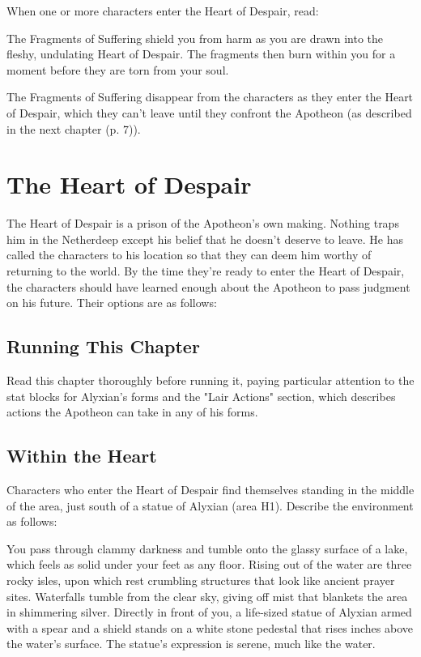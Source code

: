 \documentclass[letterpaper, 11pt, bg=full, twocolumn]{dndbook}
\begin{document}
When one or more characters enter the Heart of Despair, read:

\begin{DndReadAloud}
The Fragments of Suffering shield you from harm as you are drawn into the fleshy, undulating Heart of Despair. The fragments then burn within you for a moment before they are torn from your soul.
\end{DndReadAloud}

The Fragments of Suffering disappear from the characters as they enter the Heart of Despair, which they can't leave until they confront the Apotheon (as described in the next chapter (p. 7)).

\chapter{The Heart of Despair}\label{ch:the-heart-of-despair-8-8}

The Heart of Despair is a prison of the Apotheon's own making. Nothing traps him in the Netherdeep except his belief that he doesn't deserve to leave. He has called the characters to his location so that they can deem him worthy of returning to the world. By the time they're ready to enter the Heart of Despair, the characters should have learned enough about the Apotheon to pass judgment on his future. Their options are as follows:
\section{Running This Chapter}

Read this chapter thoroughly before running it, paying particular attention to the stat blocks for Alyxian's forms and the "Lair Actions" section, which describes actions the Apotheon can take in any of his forms.
\section{Within the Heart}

Characters who enter the Heart of Despair find themselves standing in the middle of the area, just south of a statue of Alyxian (area H1). Describe the environment as follows:

\begin{DndReadAloud}
You pass through clammy darkness and tumble onto the glassy surface of a lake, which feels as solid under your feet as any floor. Rising out of the water are three rocky isles, upon which rest crumbling structures that look like ancient prayer sites.
Waterfalls tumble from the clear sky, giving off mist that blankets the area in shimmering silver. Directly in front of you, a life-sized statue of Alyxian armed with a spear and a shield stands on a white stone pedestal that rises inches above the water's surface. The statue's expression is serene, much like the water.
\end{DndReadAloud}
\end{document}
